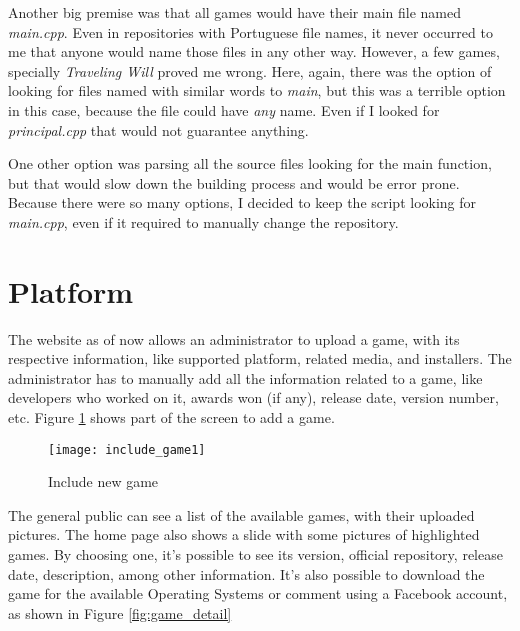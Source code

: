 Another big premise was that all games would have their main file named \textit{main.cpp}. Even in repositories with Portuguese file names, it never occurred to me that anyone would name those files in any other way. However, a few games, specially \textit{Traveling Will} proved me wrong. Here, again, there was the option of looking for files named with similar words to \textit{main}, but this was a terrible option in this case, because the file could have \textit{any} name. Even if I looked for \textit{principal.cpp} that would not guarantee anything.

One other option was parsing all the source files looking for the main function, but that would slow down the building process and would be error prone. Because there were so many options, I decided to keep the script looking for \textit{main.cpp}, even if it required to manually change the repository.

\section{Platform}
\label{sec:platform}

The website as of now allows an administrator to upload a game, with its respective information, like supported platform, related media, and installers.
The administrator has to manually add all the information related to a game, like developers who worked on it, awards won (if any), release date, version number, etc. Figure \ref{fig:include_game1} shows part of the screen to add a game.



\begin{figure}[h!]
\centering
\texttt{[image: include\_game1]}
\caption{Include new game}
\label{fig:include_game1}
\end{figure}

The general public can see a list of the available games, with their uploaded pictures. The home page also shows a slide with some pictures of highlighted games. By choosing one, it's possible to see its version, official repository, release date, description, among other information. It's also possible to download the game for the available Operating Systems or comment using a Facebook account, as shown in Figure \ref{fig:game_detail}

